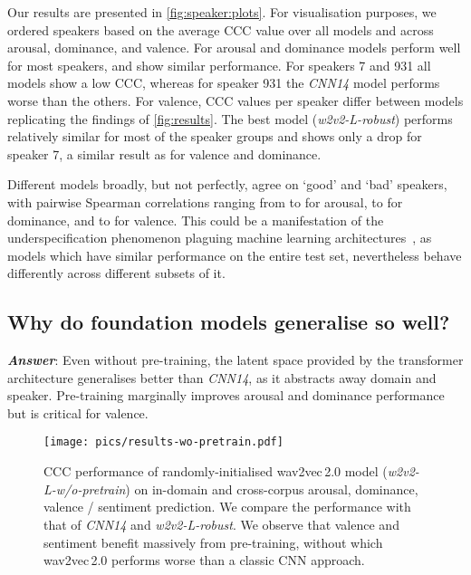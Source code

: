 \documentclass{article}
\newcommand\cnn{\mbox{\emph{CNN14}}}
\newcommand\wrobust{\mbox{\emph{w2v2-L-robust}}}
\newcommand\wwopre{\mbox{\emph{w2v2-L-w/o-pretrain}}}
\newcommand{\wtov}{wav2vec\,2.0}
\begin{document}
Our results are presented in \cref{fig:speaker:plots}.
For visualisation purposes, we ordered speakers based on the average \ac{CCC} value over all models and across arousal, dominance, and valence.
For arousal and dominance models perform well for most speakers,
and show similar performance.
For speakers 7 and 931 all models show a low CCC, whereas for speaker 931 the {\cnn} model performs worse than the others.
For valence, CCC values per speaker differ between models
replicating the findings of \cref{fig:results}.
The best model ({\wrobust}) performs relatively similar for most of the speaker groups and shows only a drop for speaker 7, a similar result as for valence and dominance.

Different models broadly, but not perfectly, agree on `good' and `bad' speakers, with pairwise Spearman correlations ranging from  to  for arousal,  to  for dominance, and  to  for valence.
This could be a manifestation of the underspecification phenomenon plaguing machine learning architectures~\citep{d2020underspecification}, as models which have similar performance on the entire test set, nevertheless behave differently across different subsets of it.





\subsection{Why do foundation models generalise so well?}
\label{subsec:tsne}

\emph{\textbf{Answer}}:
Even without pre-training,
the latent space provided by the transformer architecture generalises better than {\cnn},
as it abstracts away domain and speaker.
Pre-training marginally improves arousal and dominance performance
but is critical for valence.

\begin{figure}[t]
    \centering
    \texttt{[image: pics/results-wo-pretrain.pdf]}
    \caption{
        \ac{CCC} performance of randomly-initialised {\wtov} model (\emph{\wwopre}) on in-domain and cross-corpus arousal, dominance, valence / sentiment prediction.
        We compare the performance with that of \emph{\cnn} and \emph{\wrobust}. 
        We observe that valence and sentiment benefit massively from pre-training, without which {\wtov} performs worse than a classic CNN approach.
    }
    \label{fig:wo-pretrain}
\end{figure}
\end{document}
